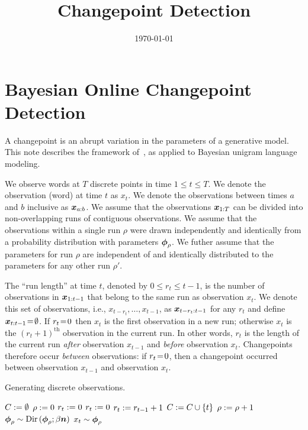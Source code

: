 \documentclass[10pt,english,oneside]{article}
\title{Changepoint Detection}
\author{}
\date{\today}
\begin{document}
\maketitle

\section{Bayesian Online Changepoint Detection}

A changepoint is an abrupt variation in the parameters of a generative
model. This note describes the framework of~\citet{adams07bayesian},
as applied to Bayesian unigram language modeling.

We observe words at $T$ discrete points in time $1 \leq t \leq T$. We
denote the observation (word) at time $t$ as $x_t$. We denote the
observations between times $a$ and $b$ inclusive as $\boldsymbol{x}_{a:b}$. We
assume that the observations $\boldsymbol{x}_{1:T}$ can be divided into
non-overlapping runs of contiguous observations. We assume that the
observations within a single run $\rho$ were drawn independently and
identically from a probability distribution with parameters
$\boldsymbol{\phi}_{\rho}$. We futher assume that the parameters for run $\rho$
are independent of and identically distributed to the parameters for
any other run $\rho'$.

The ``run length'' at time $t$, denoted by $0 \leq r_t \leq t-1$, is
the number of observations in $\boldsymbol{x}_{1:t-1}$ that belong to the same
run as observation $x_t$. We denote this set of observations, i.e.,
$x_{t-r_t}, \ldots, x_{t-1}$, as $\boldsymbol{x}_{t-r_t: t-1}$ for any $r_t$ and
define $\boldsymbol{x}_{t:t-1} \!=\! \emptyset$. If $r_t \!=\! 0$ then $x_t$ is the
first observation in a new run; otherwise $x_t$ is the $(r_t +
1)^{\textrm{th}}$ observation in the current run. In other words,
$r_t$ is the length of the current run \emph{after} observation
$x_{t-1}$ and \emph{before} observation $x_t$. Changepoints therefore
occur \emph{between} observations: if $r_t \!=\! 0$, then a changepoint
occurred between observation $x_{t-1}$ and observation $x_t$.

\begin{algorithm}[t]
  \caption[]{Generating discrete observations.}
  \label{alg:generative_process}
  \begin{algorithmic}[0]
    \State $C := \emptyset$
    \State $\rho := 0$
    \State $r_t := 0$
    \Else
    \State $r_t := 0$
    \Else
    \State $r_t := r_{t-1}+1$
    \EndIf
    \EndIf
    \State $C := C \cup \{ t \}$
    \State $\rho := \rho + 1$
    \State $\boldsymbol{\phi}_{\rho} \sim \text{Dir}\,(\boldsymbol{\phi}_{\rho}; \beta \boldsymbol{n})$
    \EndIf
    \State $x_t \sim \boldsymbol{\phi}_{\rho}$
    \EndFor
  \end{algorithmic}
\end{algorithm}
\end{document}

